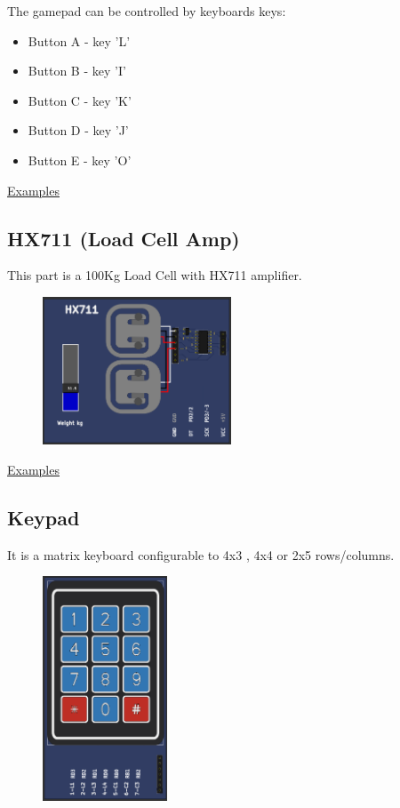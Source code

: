 The gamepad can be controlled by keyboards keys:
\begin{itemize}
 \item Button A - key 'L'
 \item Button B - key 'I'
 \item Button C - key 'K'
 \item Button D - key 'J'
 \item Button E - key 'O'
 \end{itemize}


\href{https://lcgamboa.github.io/picsimlab_examples/parts_Gamepad_(Analogic).html}{Examples}

\subsection{HX711 (Load Cell Amp)} 

This part is a 100Kg Load Cell with HX711 amplifier.

\begin{figure}[H]
\center
\includegraphics[width=0.5\textwidth]{img/part_hx711.png} 
\end{figure} 


\href{https://lcgamboa.github.io/picsimlab_examples/parts_HX711_(Load_Cell_Amp).html}{Examples}

\vspace{0.5cm}

\subsection{Keypad}

It is a matrix keyboard configurable to 4x3 , 4x4 or 2x5 rows/columns.

\begin{figure}[H]
\center
\includegraphics[width=0.33\textwidth]{img/part_keyb_4x3.png} 
\end{figure} 

